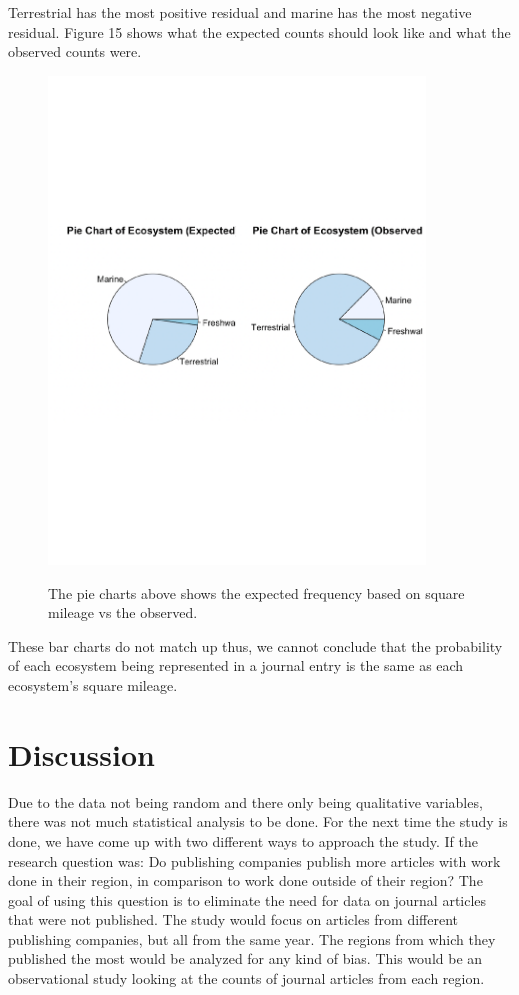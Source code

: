 \documentclass[12pt, letterpaper]{article}
\begin{document}
Terrestrial has the most positive residual and marine has the most negative residual. Figure 15 shows what the expected counts should look like and what the observed counts were. 
\begin{figure}[h]
\begin{center}
	\includegraphics[width=10cm]{pie-eco-2.pdf}
	\label{fig: Expected Frequency based on Square Mileage vs Observed Frequency}
	\caption{The pie charts above shows the expected frequency based on square mileage vs the observed.}
\end{center}
\end{figure}

These bar charts do not match up thus, we cannot conclude that the probability of each ecosystem being represented in a journal entry is the same as each ecosystem's square mileage.

\section{Discussion}
Due to the data not being random and there only being qualitative variables, there was not much statistical analysis to be done. For the next time the study is done, we have come up with two different ways to approach the study. If the research question was: Do publishing companies publish more articles with work done in their region, in comparison to work done outside of their region? The goal of using this question is to eliminate the need for data on journal articles that were not published. The study would focus on articles from different publishing companies, but all from the same year. The regions from which they published the most would be analyzed for any kind of bias. This would be an observational study looking at the counts of journal articles from each region. 
 
\end{document}
